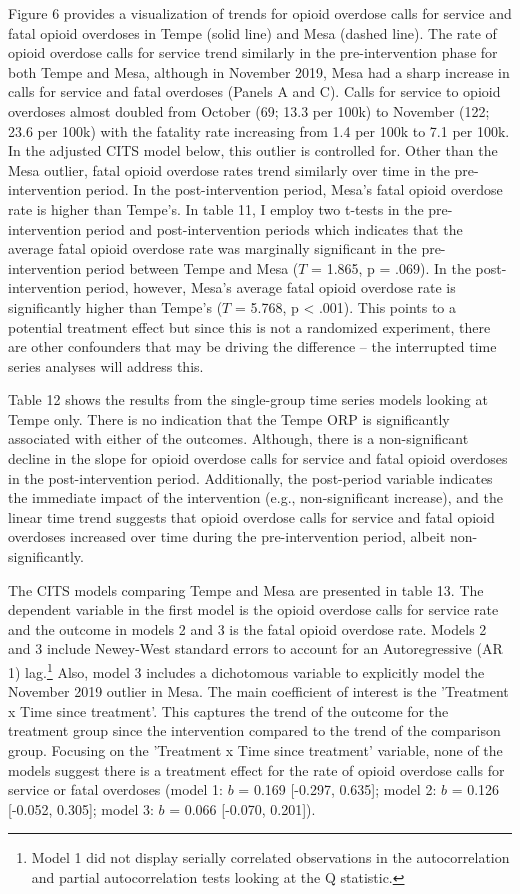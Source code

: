 Figure 6 provides a visualization of trends for opioid overdose calls for service and fatal opioid overdoses in Tempe (solid line) and Mesa (dashed line). The rate of opioid overdose calls for service trend similarly in the pre-intervention phase for both Tempe and Mesa, although in November 2019, Mesa had a sharp increase in calls for service and fatal overdoses (Panels A and C). Calls for service to opioid overdoses almost doubled from October (69; 13.3 per 100k) to November (122; 23.6 per 100k) with the fatality rate increasing from 1.4 per 100k to 7.1 per 100k. In the adjusted CITS model below, this outlier is controlled for. Other than the Mesa outlier, fatal opioid overdose rates trend similarly over time in the pre-intervention period. In the post-intervention period, Mesa's fatal opioid overdose rate is higher than Tempe's. In table 11, I employ two t-tests in the pre-intervention period and post-intervention periods which indicates that the average fatal opioid overdose rate was marginally significant in the pre-intervention period between Tempe and Mesa (\(T\) = 1.865, p = .069). In the post-intervention period, however, Mesa's average fatal opioid overdose rate is significantly higher than Tempe's (\(T\) = 5.768, p < .001). This points to a potential treatment effect but since this is not a randomized experiment, there are other confounders that may be driving the difference -- the interrupted time series analyses will address this.

Table 12 shows the results from the single-group time series models looking at Tempe only. There is no indication that the Tempe ORP is significantly associated with either of the outcomes. Although, there is a non-significant decline in the slope for opioid overdose calls for service and fatal opioid overdoses in the post-intervention period. Additionally, the post-period variable indicates the immediate impact of the intervention (e.g., non-significant increase), and the linear time trend suggests that opioid overdose calls for service and fatal opioid overdoses increased over time during the pre-intervention period, albeit non-significantly. 

The CITS models comparing Tempe and Mesa are presented in table 13. The dependent variable in the first model is the opioid overdose calls for service rate and the outcome in models 2 and 3 is the fatal opioid overdose rate. Models 2 and 3 include Newey-West standard errors to account for an Autoregressive (AR 1) lag.\footnote{Model 1 did not display serially correlated observations in the autocorrelation and partial autocorrelation tests looking at the Q statistic.} Also, model 3 includes a dichotomous variable to explicitly model the November 2019 outlier in Mesa. The main coefficient of interest is the 'Treatment x Time since treatment'. This captures the trend of the outcome for the treatment group since the intervention compared to the trend of the comparison group. Focusing on the 'Treatment x Time since treatment' variable, none of the models suggest there is a treatment effect for the rate of opioid overdose calls for service or fatal overdoses (model 1: \(b\) = 0.169 [-0.297, 0.635]; model 2: \(b\) = 0.126 [-0.052, 0.305]; model 3: \(b\) = 0.066 [-0.070, 0.201]). 

